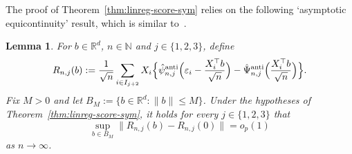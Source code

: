 \documentclass[a4paper]{article}
\newcommand{\N}{\mathbb{N}}
\newcommand{\R}{\mathbb{R}}
\newcommand{\norm}[1]{\|{#1}\|}
\newtheorem{lemma}[theorem]{Lemma}
\theoremstyle{definition}
\newcommand{\green}[1]{{\color{green!70!black}#1}}
\begin{document}
The proof of Theorem~\ref{thm:linreg-score-sym} relies on the following `asymptotic equicontinuity' result,
which is similar to~\citet[Lemma~4.1]{bickel1975one}.

\begin{lemma}
\label{lem:linreg-sym-equicontinuity}
For $b \in \R^d$, $n \in \N$ and $j \in \{1,2,3\}$, define
\[
R_{n,j}(b) := \frac{1}{\sqrt{n}}\sum_{i \in I_{j+2}} X_i\Bigl\{\hat{\psi}_{n,j}^{\mathrm{anti}}\Bigl(\varepsilon_i - \frac{X_i^\top b}{\sqrt{n}}\Bigr) - \hat{\Psi}_{n,j}^{\mathrm{anti}}\Bigl(\frac{X_i^\top b}{\sqrt{n}}\Bigr)\Bigr\}.
\]
Fix $M > 0$ and let $B_M := \{b \in \R^d : \norm{b} \leq M\}$. Under the hypotheses of Theorem~\ref{thm:linreg-score-sym}, it holds for every $j \in \{1,2,3\}$ that
\[
\sup_{b \in B_M} \norm{R_{n,j}(b) - R_{n,j}(0)} = o_p(1)
\] 
as $n \to \infty$.
\end{lemma}
\end{document}
